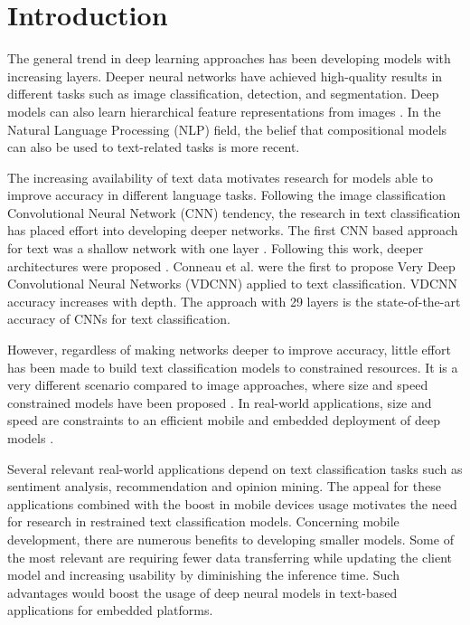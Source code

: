 \documentclass[conference]{IEEEtran}
\begin{document}
\medskip

\vspace{-3mm}

\section{Introduction}
The general trend in deep learning approaches has been developing models with increasing layers. Deeper neural networks have achieved high-quality results in different tasks such as image classification, detection, and segmentation. Deep models can also learn hierarchical feature representations from images \cite{zeiler2014visualizing}. In the Natural Language Processing (NLP) field, the belief that compositional models can also be used to text-related tasks is more recent.

The increasing availability of text data motivates research for models able to improve accuracy in different language tasks. Following the image classification Convolutional Neural Network (CNN) tendency, the research in text classification has placed effort into developing deeper networks. The first CNN based approach for text was a shallow network with one layer \cite{kim2014convolutional}. Following this work, deeper architectures were proposed \cite{conneau2016very,zhang2015character}. Conneau et al. \cite{conneau2016very} were the first to propose Very Deep Convolutional Neural Networks (VDCNN) applied to text classification. VDCNN accuracy increases with depth. The approach with 29 layers is the state-of-the-art accuracy of CNNs for text classification.

However, regardless of making networks deeper to improve accuracy, little effort has been made to build text classification models to constrained resources. It is a very different scenario compared to image approaches, where size and speed constrained models have been proposed \cite{iandola2016squeezenet, howard2017mobilenets}. In real-world applications, size and speed are constraints to an efficient mobile and embedded deployment of deep models \cite{howard2017mobilenets}.

Several relevant real-world applications depend on text classification tasks such as sentiment analysis, recommendation and opinion mining. The appeal for these applications combined with the boost in mobile devices usage motivates the need for research in restrained text classification models. Concerning mobile development, there are numerous benefits to developing smaller models. Some of the most relevant are requiring fewer data transferring while updating the client model \cite{iandola2016squeezenet} and increasing usability by diminishing the inference time. Such advantages would boost the usage of deep neural models in text-based applications for embedded platforms.
\end{document}
